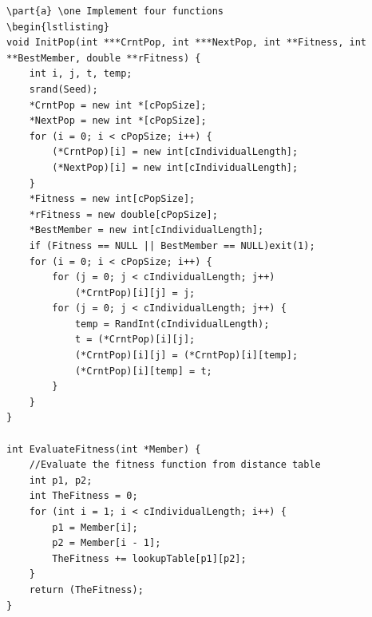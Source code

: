 \documentclass[11pt]{article}
\renewcommand\part[1]{\vspace{.10in}\textbf{(#1)}}
\newcommand\one{\vspace{.10in}\textbf{Step1: }}
\begin{document}
\begin{lstlisting}
\part{a} \one Implement four functions
\begin{lstlisting}
void InitPop(int ***CrntPop, int ***NextPop, int **Fitness, int **BestMember, double **rFitness) {
    int i, j, t, temp;
    srand(Seed);
    *CrntPop = new int *[cPopSize];
    *NextPop = new int *[cPopSize];
    for (i = 0; i < cPopSize; i++) {
        (*CrntPop)[i] = new int[cIndividualLength];
        (*NextPop)[i] = new int[cIndividualLength];
    }
    *Fitness = new int[cPopSize];
    *rFitness = new double[cPopSize];
    *BestMember = new int[cIndividualLength];
    if (Fitness == NULL || BestMember == NULL)exit(1);
    for (i = 0; i < cPopSize; i++) {
        for (j = 0; j < cIndividualLength; j++)
            (*CrntPop)[i][j] = j;
        for (j = 0; j < cIndividualLength; j++) {
            temp = RandInt(cIndividualLength);
            t = (*CrntPop)[i][j];
            (*CrntPop)[i][j] = (*CrntPop)[i][temp];
            (*CrntPop)[i][temp] = t;
        }
    }
}

int EvaluateFitness(int *Member) {
    //Evaluate the fitness function from distance table
    int p1, p2;
    int TheFitness = 0;
    for (int i = 1; i < cIndividualLength; i++) {
        p1 = Member[i];
        p2 = Member[i - 1];
        TheFitness += lookupTable[p1][p2];
    }
    return (TheFitness);
}


\end{lstlisting}
\end{document}
